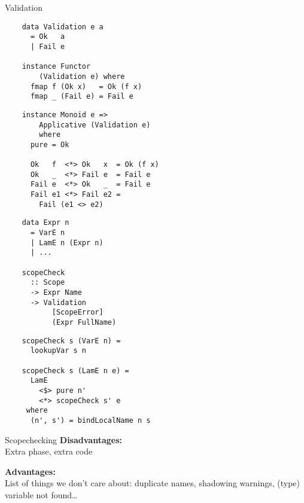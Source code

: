 \documentclass[20pt]{beamer}
\newcommand{\vspaced}{
    \vspace{5mm}
}
\begin{document}
\begin{frame}[fragile]{Validation}
    \begin{lstlisting}
    data Validation e a
      = Ok   a
      | Fail e

    instance Functor
        (Validation e) where
      fmap f (Ok x)   = Ok (f x)
      fmap _ (Fail e) = Fail e
    \end{lstlisting}
\end{frame}

\begin{frame}
    \begin{lstlisting}
    instance Monoid e =>
        Applicative (Validation e)
        where
      pure = Ok

      Ok   f  <*> Ok   x  = Ok (f x)
      Ok   _  <*> Fail e  = Fail e
      Fail e  <*> Ok   _  = Fail e
      Fail e1 <*> Fail e2 =
        Fail (e1 <> e2)
    \end{lstlisting}
\end{frame}

\begin{frame}
    \begin{lstlisting}
    data Expr n
      = VarE n
      | LamE n (Expr n)
      | ...

    scopeCheck
      :: Scope
      -> Expr Name
      -> Validation
           [ScopeError]
           (Expr FullName)
    \end{lstlisting}
\end{frame}

\begin{frame}
    \begin{lstlisting}
    scopeCheck s (VarE n) =
      lookupVar s n

    scopeCheck s (LamE n e) =
      LamE
        <$> pure n'
        <*> scopeCheck s' e
     where
      (n', s') = bindLocalName n s
    \end{lstlisting}
\end{frame}

\begin{frame}{Scopechecking}
    \textbf{Disadvantages:} \\
    Extra phase, extra code \\
    \vspaced
    \textbf{Advantages:} \\
    List of things we don't care about:
    duplicate names, shadowing warnings,
    (type) variable not found\dots
\end{frame}
\end{document}
